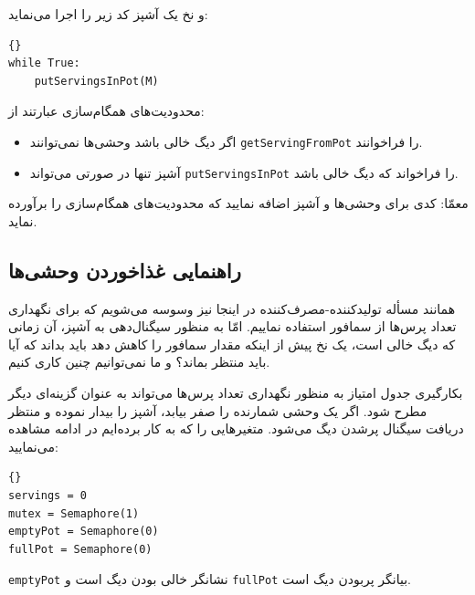 \documentclass{book}
\newcommand{\clearemptydoublepage}{}%
\begin{document}
    و نخ یک آشپز کد زیر را اجرا می‌نماید:

\begin{latin}
\begin{lstlisting}[title=\rl{کد ناهمگام آشپز}]{}
while True:
    putServingsInPot(M)
\end{lstlisting}
\end{latin}

    محدودیت‌های همگام‌سازی عبارتند از:

\begin{itemize}

\item 
    اگر دیگ خالی باشد وحشی‌ها نمی‌توانند {\tt getServingFromPot}  را فراخوانند. 

\item 
    آشپز تنها در صورتی می‌تواند  {\tt putServingsInPot} را فراخواند که دیگ خالی باشد. 

\end{itemize}

    معمّا: کدی برای وحشی‌ها و آشپز اضافه نمایید که محدودیت‌های همگام‌سازی را برآورده نماید. 

\clearemptydoublepage
\subsection{راهنمایی غذاخوردن وحشی‌ها}

    همانند مسأله تولیدکننده-مصرف‌کننده  در اینجا نیز وسوسه می‌شویم که برای نگهداری تعداد پرس‌ها از سمافور استفاده نماییم. 
    امّا به منظور سیگنال‌دهی به آشپز،‌ آن زمانی که دیگ خالی است، 
    یک نخ پیش از اینکه مقدار سمافور را کاهش دهد باید بداند که آیا باید منتظر بماند؟ و 
    ما نمی‌توانیم چنین کاری کنیم. 

    بکارگیری جدول امتیاز به منظور نگهداری تعداد پرس‌ها می‌تواند به عنوان گزینه‌ای دیگر مطرح شود.
    اگر یک وحشی شمارنده را صفر بیابد، آشپز را بیدار نموده و منتظر دریافت سیگنال پرشدن دیگ می‌شود. 
    متغیرهایی را که به کار برده‌ایم در ادامه مشاهده می‌نمایید:

\begin{latin}
\begin{lstlisting}[title={Dining Savages hint}]{}
servings = 0
mutex = Semaphore(1)
emptyPot = Semaphore(0)
fullPot = Semaphore(0)
\end{lstlisting}
\end{latin}

    {\tt emptyPot} نشانگر خالی بودن دیگ است و {\tt fullPot} بیانگر پربودن دیگ است. 
\end{document}
